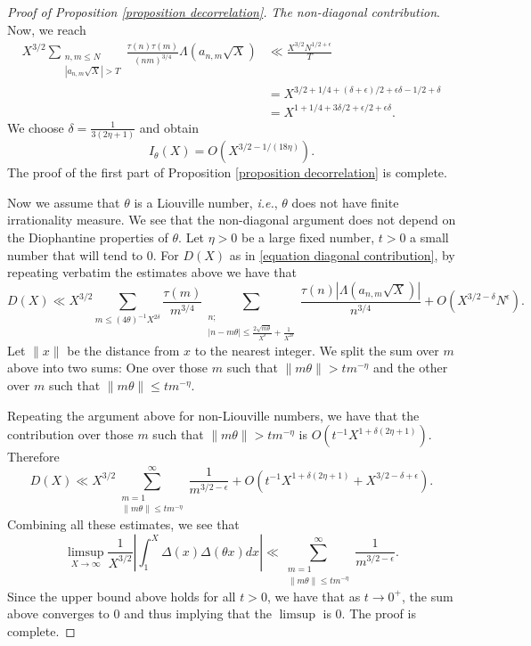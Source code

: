 \documentclass[a4paper,12pt, reqn0]{amsart}
\theoremstyle{remark}
\begin{document}
\begin{proof}[Proof of Proposition \ref{proposition decorrelation}]
\noindent \textit{The non-diagonal contribution}. Now, we reach
\begin{align*}
X^{3/2}\sum_{\substack{n,m\leq N\\ |a_{n,m}\sqrt{X}|> T}}
\frac{\tau(n)\tau(m)}{(nm)^{3/4}}\Lambda(a_{n,m}\sqrt{X})&\ll \frac{X^{3/2}N^{1/2+\epsilon}}{T}\\
&=X^{3/2+1/4+(\delta+\epsilon)/2+\epsilon\delta-1/2+\delta}\\
&=X^{1+1/4+3\delta/2+\epsilon/2+\epsilon\delta}.
\end{align*}
We choose $\delta=\frac{1}{3(2\eta+1)}$ and obtain
$$I_\theta(X)=O(X^{3/2-1/(18\eta)}).$$
The proof of the first part of Proposition \ref{proposition decorrelation} is complete. 

Now we assume that $\theta$ is a Liouville number, \textit{i.e.},
$\theta$ does not have finite irrationality measure. We see that the
non-diagonal argument does not depend on the Diophantine properties of
$\theta$. Let $\eta>0$ be a large fixed number, $t>0$ a small number
that will tend to $0$. For $D(X)$ as in \eqref{equation diagonal
  contribution}, by repeating verbatim the estimates above we have
that
$$D(X)\ll X^{3/2}\sum_{m\leq(4\theta)^{-1}X^{2\delta}}\frac{\tau(m)}{m^{3/4}}\sum_{\substack{n;\\|n-m\theta|\leq\frac{2\sqrt{m\theta}}{X^\delta}+\frac{1}{X^{2\delta}}}}\frac{\tau(n)|\Lambda(a_{n,m}\sqrt{X})|}{n^{3/4}}+O(X^{3/2-\delta}N^{\epsilon}).$$
Let $\|x\|$ be the distance from $x$ to the nearest integer. We split
the sum over $m$ above into two sums: One over those $m$ such that
$\|m\theta\|> t m^{-\eta}$ and the other over $m$ such that
$\|m\theta\|\leq t m^{-\eta}$.

Repeating the argument above for non-Liouville numbers, we have that the contribution over those $m$ such that $\|m\theta\|> t m^{-\eta}$ is $O(t^{-1}X^{1+\delta(2\eta+1)})$. Therefore
$$D(X)\ll X^{3/2}\sum_{\substack{m=1\\{\|m\theta\|\leq tm^{-\eta}}}}^\infty\frac{1}{m^{3/2-\epsilon}}+O(t^{-1}X^{1+\delta(2\eta+1)}+X^{3/2-\delta+\epsilon}).$$
Combining all these estimates, we see that
$$\limsup_{X\to\infty}\frac{1}{X^{3/2}}\left|\int_{1}^X\Delta(x)\Delta(\theta x)dx\right| \ll \sum_{\substack{m=1\\{\|m\theta\|\leq tm^{-\eta}}}}^\infty\frac{1}{m^{3/2-\epsilon}}.$$
Since the upper bound above holds for all $t>0$, we have that as
$t\to0^+$, the sum above converges to $0$ and thus implying that the
$\limsup$ is $0$. The proof is complete.  \end{proof}
\end{document}
